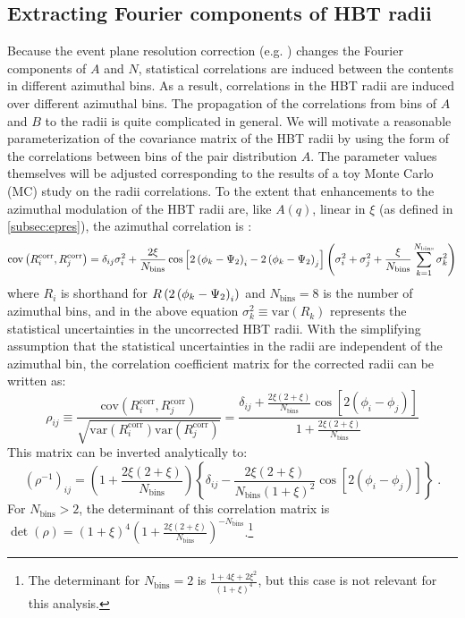 \subsection{Extracting Fourier components of HBT radii}
\label{subsec:azi_correlations}

Because the event plane resolution correction (e.g. \Eqn{\ref{eq:a_corr}}) changes the Fourier components of $A$ and $N$, statistical correlations are induced between the contents in different azimuthal bins.
As a result, correlations in the HBT radii are induced over different azimuthal bins.
The propagation of the correlations from bins of $A$ and $B$ to the radii is quite complicated in general.
We will motivate a reasonable parameterization of the covariance matrix of the HBT radii by using the form of the correlations between bins of the pair distribution $A$.
The parameter values themselves will be adjusted corresponding to the results of a toy Monte Carlo (MC) study on the radii correlations.
To the extent that enhancements to the azimuthal modulation of the HBT radii are, like $A(q)$, linear in $\xi$ (as defined in \cref{subsec:epres}), the azimuthal correlation is :
\begin{equation} \label{eq:azi_corr}
\textrm{cov}\left( R^\textrm{corr}_i, R^\textrm{corr}_j \right) = \delta_{ij} \sigma^2_{i} + \frac{2\xi}{N_\textrm{bins}} \cos\left[2\left(\phi_{k}-\Psi_{2}\right)_i - 2\left(\phi_{k}-\Psi_{2}\right)_j \right] \left( \sigma^2_{i} + \sigma^2_{j} + \frac{\xi}{N_\textrm{bins}} \sum_{k=1}^{N_\textrm{bins}} \sigma^2_{k} \right)
\end{equation}
where $R_i$ is shorthand for $R\left(2\left(\phi_{k}-\Psi_{2}\right)_i\right)$ and $N_\textrm{bins}=8$ is the number of azimuthal bins, and in the above equation $\sigma^2_{k} \equiv \mathrm{var}(R_k)$ represents the statistical uncertainties in the uncorrected HBT radii. With the simplifying assumption that the statistical uncertainties in the radii are independent of the azimuthal bin, the correlation coefficient matrix for the corrected radii can be written as:
\begin{equation} \label{eq:corr_coeff_matrix}
  \rho_{ij} \equiv \frac{\mathrm{cov}\left( R^\textrm{corr}_i, R^\textrm{corr}_j \right)}{\sqrt{\mathrm{var}\left( R^\textrm{corr}_i \right) \mathrm{var}\left( R^\textrm{corr}_j \right)}}
  = \frac{\delta_{ij} + \frac{2\xi(2+\xi)}{N_\textrm{bins}} \cos{\left[2(\phi_i-\phi_j)\right]}}{1 + \frac{2\xi(2+\xi)}{N_\textrm{bins}}}
\end{equation}
This matrix can be inverted analytically to:
\begin{equation} \label{eq:corr_coeff_matrix_inv}
(\rho^{-1})_{ij} = \left(1 + \frac{2\xi(2+\xi)}{N_\textrm{bins}}\right)\left\{\delta_{ij} - \frac{2\xi(2+\xi)}{N_\textrm{bins}(1+\xi)^2} \cos{\left[2(\phi_i-\phi_j)\right]}\right\} \;.
\end{equation}
For $N_\textrm{bins} > 2$, the determinant of this correlation matrix is $\det(\rho) = \left(1 + \xi\right)^{4}\left(1 + \frac{2\xi(2+\xi)}{N_\textrm{bins}} \right)^{-N_\textrm{bins}}$.\footnote{The determinant for $N_\textrm{bins} = 2$ is $\frac{1+4\xi+2\xi^2}{(1+\xi)^4}$, but this case is not relevant for this analysis.}


